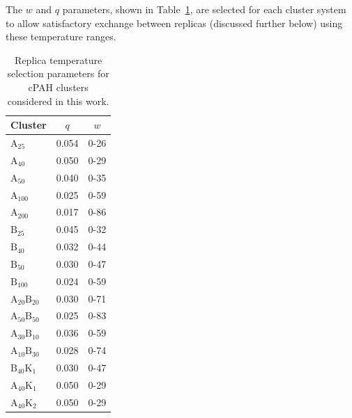 The $w$ and $q$ parameters, shown in Table~\ref{tableSI:REMDparams}, are selected for each cluster system to allow satisfactory exchange between replicas (discussed further below) using these temperature ranges.
%
\begin{table}[ht]
\centering
\caption{Replica temperature selection parameters %
for cPAH clusters considered in this work.}
\label{tableSI:REMDparams}
\begin{tabular}{lcc}%
\hline
Cluster & $q$ & $w$ \\ \hline %
$\text{A}_{\text{25}}$ & 0.054 & 0-26 \\ %
$\text{A}_{\text{40}}$ & 0.050 & 0-29 \\ %
$\text{A}_{\text{50}}$ & 0.040 & 0-35 \\ %
$\text{A}_{\text{100}}$ & 0.025 & 0-59 \\ %
$\text{A}_{\text{200}}$ & 0.017 & 0-86 \\ \hline %
$\text{B}_{\text{25}}$ & 0.045 & 0-32 \\ %
$\text{B}_{\text{40}}$ & 0.032 & 0-44 \\ %
$\text{B}_{\text{50}}$ & 0.030 & 0-47 \\ %
$\text{B}_{\text{100}}$ & 0.024 & 0-59 \\ \hline %
$\text{A}_{\text{20}}\text{B}_{\text{20}}$ & 0.030 & 0-71 \\ %
$\text{A}_{\text{50}}\text{B}_{\text{50}}$ & 0.025 & 0-83 \\ %
$\text{A}_{\text{30}}\text{B}_{\text{10}}$ & 0.036 & 0-59 \\ %
$\text{A}_{\text{10}}\text{B}_{\text{30}}$ & 0.028 & 0-74 \\ \hline %
$\text{B}_{\text{40}}\text{K}_{\text{1}}$ & 0.030 & 0-47 \\ %
$\text{A}_{\text{40}}\text{K}_{\text{1}}$ & 0.050 & 0-29 \\ %
$\text{A}_{\text{40}}\text{K}_{\text{2}}$ & 0.050 & 0-29 \\ \hline %
\end{tabular}
\end{table}
%

